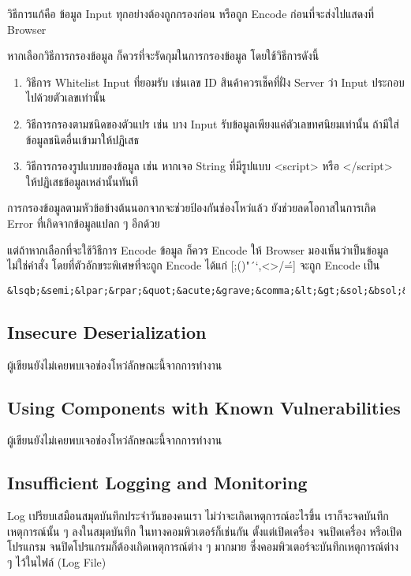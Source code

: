 วิธีการแก้คือ ข้อมูล Input ทุกอย่างต้องถูกกรองก่อน หรือถูก Encode ก่อนที่จะส่งไปแสดงที่ Browser

หากเลือกวิธีการกรองข้อมูล ก็ควรที่จะรัดกุมในการกรองข้อมูล โดยใช้วิธีการดังนี้

\begin{enumerate}
	\item วิธีการ Whitelist Input ที่ยอมรับ เช่นเลข ID สินค้าควรเช็คที่ฝั่ง Server ว่า Input ประกอบไปด้วยตัวเลขเท่านั้น
	\item วิธีการกรองตามชนิดของตัวแปร เช่น บาง Input รับข้อมูลเพียงแค่ตัวเลขทศนิยมเท่านั้น ถ้ามีใส่ข้อมูลชนิดอื่นเข้ามาให้ปฏิเสธ
	\item วิธีการกรองรูปแบบของข้อมูล เช่น หากเจอ String ที่มีรูปแบบ <script> หรือ </script> ให้ปฏิเสธข้อมูลเหล่านั้นทันที
\end{enumerate}

การกรองข้อมูลตามหัวข้อข้างต้นนอกจากจะช่วยป้องกันช่องโหว่แล้ว ยังช่วยลดโอกาสในการเกิด Error ที่เกิดจากข้อมูลแปลก ๆ อีกด้วย

แต่ถ้าหากเลือกที่จะใช้วิธีการ Encode ข้อมูล ก็ควร Encode ให้ Browser มองเห็นว่าเป็นข้อมูลไม่ใช่คำสั่ง โดยที่ตัวอักขระพิเศษที่จะถูก Encode ได้แก่ [;()"´`,<>/\'=] จะถูก Encode เป็น

 \begin{lstlisting}[numbers=none]
&lsqb;&semi;&lpar;&rpar;&quot;&acute;&grave;&comma;&lt;&gt;&sol;&bsol;&apos;&equals;&rsqb;
\end{lstlisting}

\subsection{Insecure Deserialization}
ผู้เขียนยังไม่เคยพบเจอช่องโหว่ลักษณะนี้จากการทำงาน
\subsection{Using Components with Known Vulnerabilities}
ผู้เขียนยังไม่เคยพบเจอช่องโหว่ลักษณะนี้จากการทำงาน
\subsection{Insufficient Logging and Monitoring}

Log เปรียบเสมือนสมุดบันทึกประจำวันของคนเรา ไม่ว่าจะเกิดเหตุการณ์อะไรขึ้น เราก็จะจดบันทึกเหตุการณ์นั้น ๆ ลงในสมุดบันทึก ในทางคอมพิวเตอร์ก็เช่นกัน ตั้งแต่เปิดเครื่อง จนปิดเครื่อง หรือเปิดโปรแกรม จนปิดโปรแกรมก็ต้องเกิดเหตุการณ์ต่าง ๆ มากมาย ซึ่งคอมพิวเตอร์จะบันทึกเหตุการณ์ต่าง ๆ ไว้ในไฟล์ (Log File)

